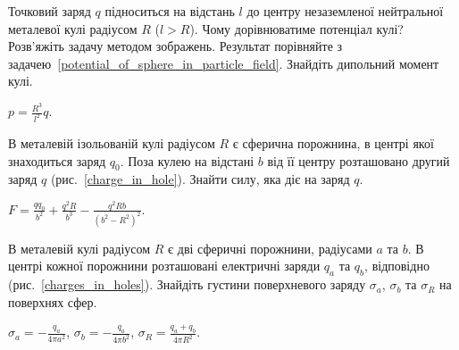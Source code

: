\begin{problem}
    Точковий заряд $q$ підноситься на відстань $l$ до центру незаземленої нейтральної металевої кулі радіусом $R$ ($l > R$). Чому дорівнюватиме потенціал кулі? Розв'яжіть задачу методом зображень. Результат порівняйте з задачею~\ref{potential_of_sphere_in_particle_field}. Знайдіть дипольний момент кулі.
	\begin{solution}
		$p = \frac{R^3}{l^2} q$.
	\end{solution}
\end{problem}

\begin{problem}\label{prb:charge_in_hole}
В металевій ізольованій кулі радіусом $R$ є сферична порожнина, в центрі якої знаходиться заряд $q_0$. Поза кулею на відстані $b$ від її центру розташовано другий заряд $q$ (рис.~\ref{charge_in_hole}). Знайти силу, яка діє на заряд $q$.
\begin{solution}
	$ F =  \frac{qq_0}{b^2} + \frac{q^2 R}{b^3} - \frac{q^2 Rb}{(b^2 - R^2)^2}$.
\end{solution}
\end{problem}

\begin{problem}\label{prb:charges_in_holes}
В металевій кулі радіусом $R$ є дві сферичні порожнини, радіусами $a$ та $b$. В центрі кожної порожнини розташовані електричні заряди $q_a$ та $q_b$, відповідно (рис.~\ref{charges_in_holes}). Знайдіть густини поверхневого заряду $\sigma_a$, $\sigma_b$ та $\sigma_R$ на поверхнях сфер.
\begin{solution}
	$\sigma_a = -\frac{q_a}{4\pi a^2}$, $\sigma_b = -\frac{q_a}{4\pi b^2}$, $\sigma_R = \frac{q_a + q_b}{4\pi R^2}$.
\end{solution}
\end{problem}

